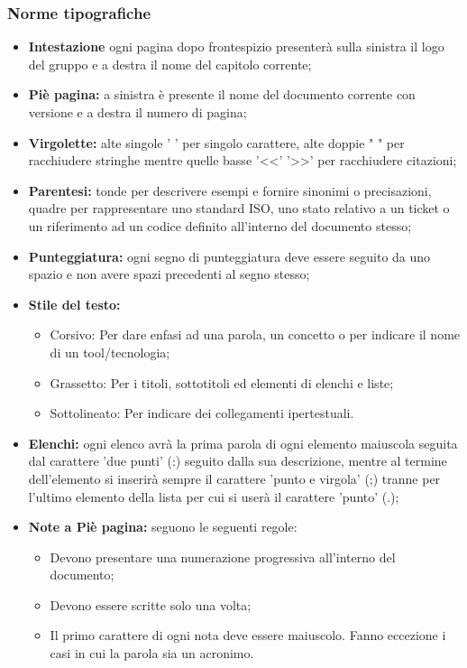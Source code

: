 \documentclass[NormeDiProgetto.tex]{subfiles}
\begin{document}
	\subsubsection{Norme tipografiche}
		\begin{itemize}
			\item \textbf{Intestazione} ogni pagina dopo frontespizio presenterà sulla sinistra il logo del gruppo e a destra il nome del capitolo corrente;
			
			\item \textbf{Piè pagina:} a sinistra è presente il nome del documento corrente con versione e a destra il numero di pagina; 
			
			\item \textbf{Virgolette:} alte singole ' ' per singolo carattere, alte doppie " " per racchiudere stringhe mentre quelle basse '\textless \textless ' '\textgreater \textgreater ' per racchiudere citazioni;
			 
			\item \textbf{Parentesi:} tonde per descrivere esempi e fornire sinonimi o precisazioni, quadre per rappresentare uno standard ISO, uno stato relativo a un ticket o un riferimento ad un codice definito all'interno del documento stesso;
			
			\item \textbf{Punteggiatura:} ogni segno di punteggiatura deve essere seguito da uno spazio e non avere spazi precedenti al segno stesso;

			\item \textbf{Stile del testo:} 
			\begin{itemize}
				\item Corsivo: Per dare enfasi ad una parola, un concetto o per indicare il nome di un tool/tecnologia;
				\item Grassetto: Per i titoli, sottotitoli ed elementi di elenchi e liste;
				\item Sottolineato: Per indicare dei collegamenti ipertestuali.
			\end{itemize}
		
			\item \textbf{Elenchi:} ogni elenco avrà la prima parola di ogni elemento maiuscola seguita dal carattere 'due punti' (:) seguito dalla sua descrizione, mentre al termine dell'elemento si inserirà sempre il carattere 'punto e virgola' (;) tranne per l'ultimo elemento della lista per cui si userà il carattere 'punto' (.);
			 
			\item \textbf{Note a Piè pagina:} seguono le seguenti regole: 
			\begin{itemize}
				\item Devono presentare una numerazione progressiva all'interno del documento;
				\item Devono essere scritte solo una volta;
				\item Il primo carattere di ogni nota deve essere maiuscolo. Fanno eccezione i casi in cui la parola sia un acronimo.
			\end{itemize}
			 

\end{itemize}
\end{document}

